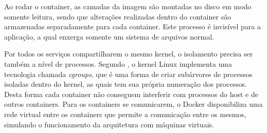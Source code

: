Ao rodar o container, as camadas da imagem são montadas no disco em modo
somente leitura, sendo que alterações realizadas dentro do container são
armazenadas separadamente para cada container. Este processo é invisível para
a aplicação, a qual enxerga somente um sistema de arquivos normal.

Por todos os serviços compartilharem o mesmo kernel, o isolamento precisa
ser também a nível de processos. Segundo ,
o kernel Linux implementa uma tecnologia chamada \emph{cgroups}, que é uma
forma de criar subárvores de processos isoladas dentro do kernel,
as quais tem sua própria numeração dos processos. Desta forma cada container
não conseguem interferir com processos do host e de outros containers. Para os
containers se comunicarem, o Docker disponibiliza uma rede virtual entre os
containers que permite a comunicação entre os mesmos, simulando o funcionamento
da arquitetura com máquinas virtuais.
